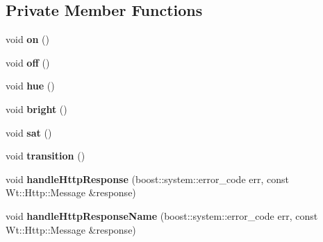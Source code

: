 \subsection*{Private Member Functions}
\begin{DoxyCompactItemize}
\item 
void {\bfseries on} ()\hypertarget{classSingleSchedulerControlWidget_a9bf7fc2a7f5777a9cd29ba290f61b328}{}\label{classSingleSchedulerControlWidget_a9bf7fc2a7f5777a9cd29ba290f61b328}

\item 
void {\bfseries off} ()\hypertarget{classSingleSchedulerControlWidget_af9a4503965dc2e65ce89ecf713b02142}{}\label{classSingleSchedulerControlWidget_af9a4503965dc2e65ce89ecf713b02142}

\item 
void {\bfseries hue} ()\hypertarget{classSingleSchedulerControlWidget_a56c043e77f1fa91e9ccab3bcc144ef0e}{}\label{classSingleSchedulerControlWidget_a56c043e77f1fa91e9ccab3bcc144ef0e}

\item 
void {\bfseries bright} ()\hypertarget{classSingleSchedulerControlWidget_a0a8907804650230979459acd5939a532}{}\label{classSingleSchedulerControlWidget_a0a8907804650230979459acd5939a532}

\item 
void {\bfseries sat} ()\hypertarget{classSingleSchedulerControlWidget_a1e7fe9995f628b039703c16e0309a449}{}\label{classSingleSchedulerControlWidget_a1e7fe9995f628b039703c16e0309a449}

\item 
void {\bfseries transition} ()\hypertarget{classSingleSchedulerControlWidget_a19a9fc395a8496d67130fb15f15a22c0}{}\label{classSingleSchedulerControlWidget_a19a9fc395a8496d67130fb15f15a22c0}

\item 
void {\bfseries handle\+Http\+Response} (boost\+::system\+::error\+\_\+code err, const Wt\+::\+Http\+::\+Message \&response)\hypertarget{classSingleSchedulerControlWidget_a323e0c1f1a0b7a3c1756e59f121f2686}{}\label{classSingleSchedulerControlWidget_a323e0c1f1a0b7a3c1756e59f121f2686}

\item 
void {\bfseries handle\+Http\+Response\+Name} (boost\+::system\+::error\+\_\+code err, const Wt\+::\+Http\+::\+Message \&response)\hypertarget{classSingleSchedulerControlWidget_ab4aff107cf49bdae8ba7c5650297e78e}{}\label{classSingleSchedulerControlWidget_ab4aff107cf49bdae8ba7c5650297e78e}


\end{DoxyCompactItemize}
